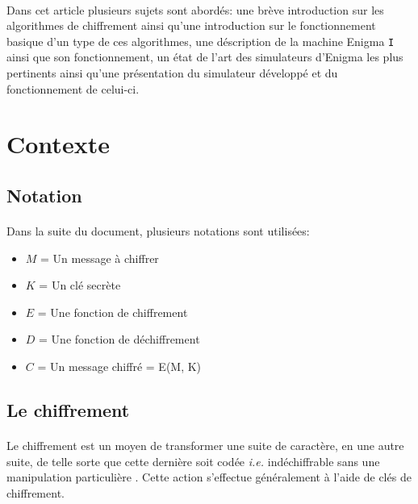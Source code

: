 \documentclass[letterpaper]{article}
\begin{document}
\paragraph{}

Dans cet article plusieurs sujets sont abordés: une brève introduction sur les algorithmes de chiffrement ainsi qu'une introduction sur le fonctionnement basique d'un type de ces algorithmes, une déscription de la machine Enigma \texttt{I} ainsi que son fonctionnement, un état de l'art des simulateurs d'Enigma les plus pertinents ainsi qu'une présentation du simulateur développé et du fonctionnement de celui-ci.

\section{Contexte}

\subsection{Notation}

\paragraph{}
Dans la suite du document, plusieurs notations sont utilisées:
\begin{itemize}
    \item $M$ = Un message à chiffrer
    \item $K$ = Un clé secrète
    \item $E$ = Une fonction de chiffrement
    \item $D$ = Une fonction de déchiffrement
    \item $C$ = Un message chiffré = E(M, K)
\end{itemize}

\subsection{Le chiffrement}

\paragraph{}

Le chiffrement est un moyen de transformer une suite de caractère, en une autre suite, de telle sorte
que cette dernière soit codée \textit{i.e.} indéchiffrable sans une manipulation particulière \cite{MCEE}.
Cette action s'effectue généralement à l'aide de clés de chiffrement. 
\end{document}
